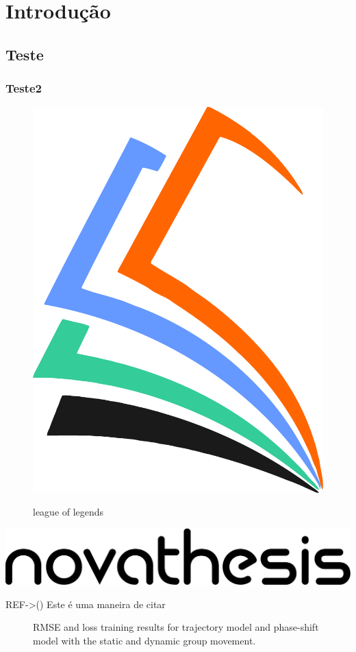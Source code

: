 
%

\chapter{Introdução}
\label{cha:introduction}

\section{Teste}

\subsection{Teste2}


\begin{figure}[htbp]
	\centering
	\includegraphics[width=0.1\linewidth]{NOVAthesisFiles/Images/novathesis-insignia}
	\label{fig:1}
	\caption{league of legends}
\end{figure}

\includegraphics[width=0.875\linewidth]{NOVAthesisFiles/Images/novathesis-text}


REF->(\cite{novathesis-manual}) Este é uma maneira de citar

\begin{figure}[htbp]
	\centering
	\hfil
	\caption{RMSE and loss training results for trajectory model and phase-shift model with the static and dynamic group movement.}
	\label{fig:models_results_lstms_loss} 
\end{figure}